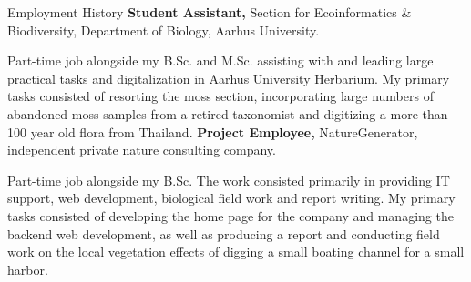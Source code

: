 \begin{rubric}{Employment History}
\entry*[2021 -- 2023]%
	\textbf{Student Assistant,} Section for Ecoinformatics \& Biodiversity, Department of Biology, Aarhus University.\par
    \pind Part-time job alongside my B.Sc. and M.Sc. assisting with and leading large practical tasks and digitalization in Aarhus University Herbarium. My primary tasks consisted of resorting the moss section, incorporating large numbers of abandoned moss samples from a retired taxonomist and digitizing a more than 100 year old flora from Thailand.
\entry*[2020 -- 2021]%
    \textbf{Project Employee,} NatureGenerator, independent private nature consulting company.\par
    \pind Part-time job alongside my B.Sc. The work consisted primarily in providing IT support, web development, biological field work and report writing. My primary tasks consisted of developing the home page for the company and managing the backend web development, as well as producing a report and conducting field work on the local vegetation effects of digging a small boating channel for a small harbor. 
%
%

\end{rubric}